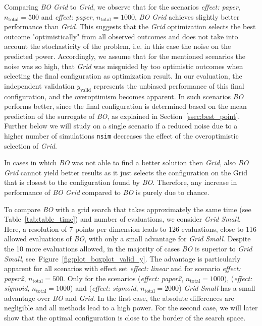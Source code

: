 \documentclass[bimj,fleqn]{w-art}
\theoremstyle{plain}
\theoremstyle{definition}
\begin{document}
Comparing \emph{BO Grid} to \emph{Grid}, we observe that for the scenarios \emph{effect: paper}, $n_{\text{total}} = 500$ and \emph{effect: paper}, $n_{\text{total}} = 1000$, \emph{BO Grid} achieves slightly better performance than \emph{Grid}.
This suggests that the \emph{Grid} optimization selects the best outcome "optimistically" from all observed outcomes and does not take into account the stochasticity of the problem, i.e. in this case the noise on the predicted power. 
Accordingly, we assume that for the mentioned scenarios the noise was so high, that \emph{Grid} was misguided by too optimistic outcomes when selecting the final configuration as optimization result.
In our evaluation, the independent validation $y_{\text{valid}}$ represents the unbiased performance of this final configuration, and the overoptimism becomes apparent.
In such scenarios \emph{BO} performs better, since the final configuration is determined based on the mean prediction of the surrogate of \emph{BO}, as explained in Section~\ref{ssec:best_point}.
Further below we will study on a single scenario if a reduced noise due to a higher number of simulations \texttt{nsim} decreases the effect of the overoptimistic selection of \emph{Grid}.

In cases in which \emph{BO} was not able to find a better solution then \emph{Grid}, also \emph{BO Grid} cannot yield better results as it just selects the configuration on the Grid that is closest to the configuration found by \emph{BO}.
Therefore, any increase in performance of \emph{BO Grid} compared to \emph{BO} is purely due to chance.

To compare \emph{BO} with a grid search that takes approximately the same time (see Table~\ref{tab:table_time}) and number of evaluations, we consider \emph{Grid Small}.
Here, a resolution of 7 points per dimension leads to 126 evaluations, close to 116 allowed evaluations of \emph{BO}, with only a small advantage for \emph{Grid Small}.
Despite the 10 more evaluations allowed, in the majority of cases \emph{BO} is superior to \emph{Grid Small}, see~Figure~\ref{fig:plot_boxplot_valid_y}.
The advantage is particularly apparent for all scenarios with effect set \emph{effect: linear} and for scenario \emph{effect: paper2}, $n_{\text{total}} = 500$.
Only for the scenarios (\emph{effect: paper2}, $n_{\text{total}} = 1000$), (\emph{effect: sigmoid}, $n_{\text{total}} = 1000$) and (\emph{effect: sigmoid}, $n_{\text{total}} = 2000$) \emph{Grid Small} has a small advantage over \emph{BO} and \emph{Grid}.
In the first case, the absolute differences are negligible and all methods lead to a high power.
For the second case, we will later show that the optimal configuration is close to the border of the search space.
\end{document}
